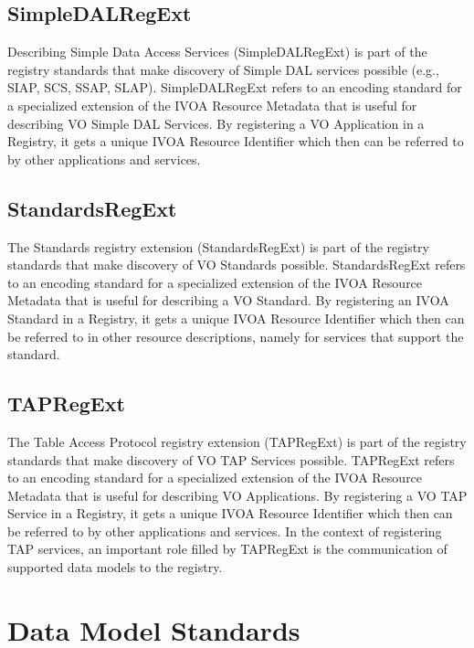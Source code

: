 \documentclass[11pt,letter]{ivoa}
\begin{document}
\subsection{SimpleDALRegExt}

Describing Simple Data Access Services (SimpleDALRegExt)
\citep{2022ivoa.spec.0222D}
is part of the registry standards that make discovery of Simple DAL
services
possible (e.g., SIAP, SCS, SSAP, SLAP). SimpleDALRegExt refers to an
encoding standard for a
specialized extension of the IVOA Resource Metadata that is useful for
describing VO Simple DAL
Services. By registering a VO Application in a Registry, it gets a
unique IVOA Resource
Identifier which then can be referred to by other applications and
services.

\subsection{StandardsRegExt}

The Standards registry extension (StandardsRegExt)
\citep{2012ivoa.spec.0508H} is part of the registry standards that make
discovery of VO Standards possible.
StandardsRegExt refers to an encoding standard for a specialized
extension of the IVOA Resource
Metadata that is useful for describing a VO Standard. By registering an
IVOA Standard in a
Registry, it gets a unique IVOA Resource Identifier which then can be
referred to in other
resource descriptions, namely for services that support the standard.

\subsection{TAPRegExt}

The Table Access Protocol registry extension (TAPRegExt)
\citep{2012ivoa.spec.0827D} is part of the registry standards that make
discovery of VO TAP Services possible.
TAPRegExt refers to an encoding standard for a specialized extension of
the IVOA Resource Metadata
that is useful for describing VO Applications. By registering a VO TAP
Service in a Registry, it
gets a unique IVOA Resource Identifier which then can be referred to by
other applications and
services. In the context of registering TAP services, an important role
filled by TAPRegExt is
the communication of supported data models to the registry.

\section{Data Model Standards}
\end{document}

